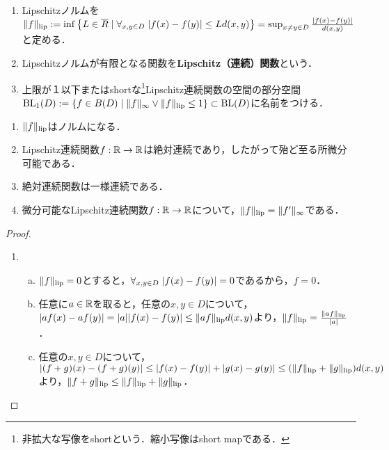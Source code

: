 \documentclass[uplatex,dvipdfmx]{jsreport}
\begin{document}
\begin{definition}\mbox{}
    \begin{enumerate}
        \item Lipschitzノルムを$\|f\|_{\textrm{lip}}:=\inf\left\{L\in\overline{R}\mid\forall_{x,y\in D}\;\lvert f(x)-f(y)\rvert\le Ld(x,y)\right\}=\sup_{x\ne y\in D}\frac{\lvert f(x)-f(y)\rvert}{d(x,y)}$と定める．
        \item Lipschitzノルムが有限となる関数を\textbf{Lipschitz（連続）関数}という．
        \item 上限が１以下またはshortな\footnote{非拡大な写像をshortという．縮小写像はshort mapである．}Lipschitz連続関数の空間の部分空間$\mathrm{BL}_1(D):=\left\{f\in B(D)\mid \|f\|_\infty\lor\|f\|_{\textrm{lip}}\le1\right\}\subset\mathrm{BL}(D)$に名前をつける．
    \end{enumerate}
\end{definition}

\begin{lemma}[Lipschitz連続性]\mbox{}
    \begin{enumerate}
        \item $\|f\|_{\textrm{lip}}$はノルムになる．
        \item Lipschitz連続関数$f:\mathbb{R}\to\mathbb{R}$は絶対連続であり，したがって殆ど至る所微分可能である．
        \item 絶対連続関数は一様連続である．
        \item 微分可能なLipschitz連続関数$f:\mathbb{R}\to\mathbb{R}$について，$\|f\|_{\textrm{lip}}=\|f'\|_\infty$である．
    \end{enumerate}
\end{lemma}
\begin{proof}\mbox{}
    \begin{enumerate}
        \item \begin{enumerate}[(a)]
            \item $\|f\|_{\textrm{lip}}=0$とすると，$\forall_{x,y\in D}\;\lvert f(x)-f(y)\rvert=0$であるから，$f=0$．
            \item 任意に$a\in\mathbb{R}$を取ると，任意の$x,y\in D$について，$\lvert af(x)-af(y)\rvert=\lvert a\rvert\lvert f(x)-f(y)\rvert\le\|af\|_{\textrm{lip}} d(x,y)$より，$\|f\|_{\textrm{lip}}=\frac{\|af\|_{\textrm{lip}}}{\lvert a\rvert}$．
            \item 任意の$x,y\in D$について，$\lvert(f+g)(x)-(f+g)(y)\rvert\le\lvert f(x)-f(y)\rvert+\lvert g(x)-g(y)\rvert\le(\|f\|_{\textrm{lip}}+\|g\|_{\textrm{lip}})d(x,y)$より，$\|f+g\|_{\textrm{lip}}\le\|f\|_{\textrm{lip}}+\|g\|_{\textrm{lip}}$．
        \end{enumerate}
    \end{enumerate}
\end{proof}
\end{document}
